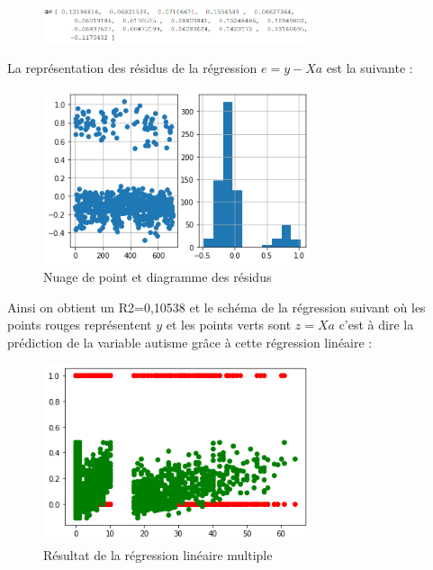 \documentclass[12,french]{report}
\begin{document}
\begin{figure}[H]
	\center
	\includegraphics[width=0.7\textwidth]{./Images/a}
\end{figure}\vspace{0.1cm}

La représentation des résidus de la régression $e = y-Xa$ est la suivante :

\begin{figure}[H]
	\center
	\includegraphics[width=0.7\textwidth]{./Images/21}
	\caption{Nuage de point et diagramme des résidus}
\end{figure}\vspace{0.1cm}

Ainsi on obtient un R2=0,10538 et le schéma de la régression suivant où les points rouges représentent $y$ et les points verts sont $z=Xa$ c’est à dire la prédiction de la variable autisme grâce à cette régression linéaire :

\pagebreak

\begin{figure}[H]
	\center
	\includegraphics[width=0.7\textwidth]{./Images/22}
	\caption{Résultat de la régression linéaire multiple}
\end{figure}\vspace{0.1cm}
\end{document}
